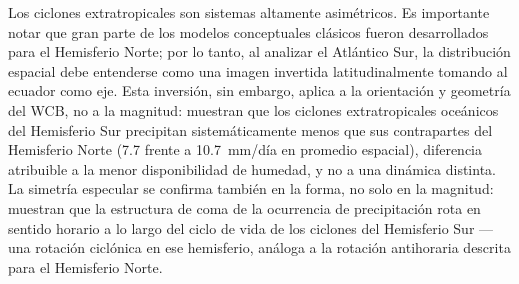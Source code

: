 %

Los ciclones extratropicales son sistemas altamente asimétricos.
Es importante notar que gran parte de los modelos conceptuales clásicos fueron desarrollados para el Hemisferio Norte; por lo tanto, al analizar el Atlántico Sur, la distribución espacial debe entenderse como una imagen invertida latitudinalmente tomando al ecuador como eje. Esta inversión, sin embargo, aplica a la orientación y geometría del WCB, no a la magnitud: \citet{kodama2019perspective} muestran que los ciclones extratropicales oceánicos del Hemisferio Sur precipitan sistemáticamente menos que sus contrapartes del Hemisferio Norte (7.7 frente a 10.7~mm/día en promedio espacial), diferencia atribuible a la menor disponibilidad de humedad, y no a una dinámica distinta. La simetría especular se confirma también en la forma, no solo en la magnitud: \citet{mcerlich2023extremes} muestran que la estructura de coma de la ocurrencia de precipitación rota en sentido horario a lo largo del ciclo de vida de los ciclones del Hemisferio Sur —una rotación ciclónica en ese hemisferio, análoga a la rotación antihoraria descrita para el Hemisferio Norte.

